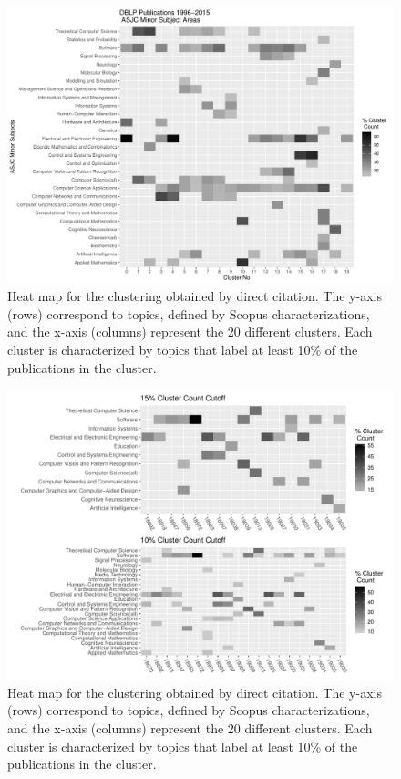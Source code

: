 \begin{figure}[ht]
  \includegraphics[scale=0.45]{scopus_dblp_graclus3.pdf}
\caption{Heat map for the clustering obtained by direct citation. The  y-axis (rows) correspond to topics, defined by Scopus characterizations, and the
x-axis (columns) represent the 20 different clusters.  
Each cluster is characterized by topics that label at least 10\% of the publications in the cluster.
 }
\label{fig:heatmap}       %
\end{figure}

\begin{figure}[ht]
  \includegraphics[scale=0.45]{scopus_dblp_heatmap3.pdf}
\caption{Heat map for the clustering obtained by direct citation. The  y-axis (rows) correspond to topics, defined by Scopus characterizations, and the
x-axis (columns) represent the 20 different clusters.  
Each cluster is characterized by topics that label at least 10\% of the publications in the cluster.
 }
\label{fig:heatmap}       %
\end{figure}
\newpage

